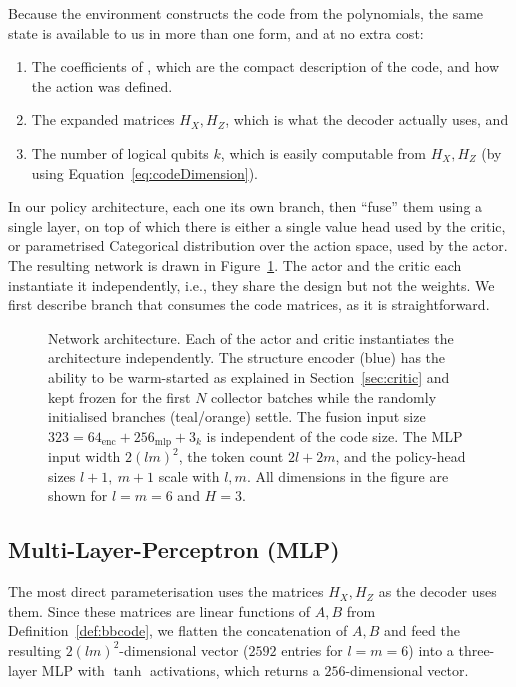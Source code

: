 \noindent Because the environment constructs the code from the polynomials, the same state is available to us in
more than one form, and at no extra cost:
\begin{enumerate}
  \item The coefficients of \polynomials{}, which are the compact description of the code, and how the action was defined.
  \item The expanded matrices \(H_X, H_Z\), which is what the decoder actually uses, and
  \item The number of logical qubits \(k\), which is easily computable from \(H_X,H_Z\) (by using Equation~\ref{eq:codeDimension}).
\end{enumerate}
In our policy architecture, each one its own branch, then ``fuse'' them using a single layer, 
on top of which there is either a single value head used by the critic, or parametrised Categorical distribution over the action space, used by the actor.
The resulting network is drawn in Figure~\ref{fig:hybrid}. 
The actor and the critic each instantiate it independently, i.e., they share the design but not the weights.
We first describe branch that consumes the code matrices, as it is straightforward.
\begin{figure}
  \centering
  \resizebox{\textwidth}{!}{}
  \caption{Network architecture. Each of the actor and critic instantiates
  the architecture independently. The structure encoder
  (blue) has the ability to be warm-started as explained in Section~\ref{sec:critic} and kept frozen for the
  first \(N\) collector batches while the randomly initialised branches
  (teal/orange) settle. 
  The fusion input size \(323 = 64_{\mathrm{enc}} + 256_{\mathrm{mlp}} + 3_{k}\) is
independent of the code size. The MLP input width \(2(lm)^2\), the token count
\(2l+2m\), and the policy-head sizes \(l{+}1,\ m{+}1\) scale with \(l,m\). All
dimensions in the figure are shown for \(l=m=6\) and \(H=3\).}
  \label{fig:hybrid}
\end{figure}

\subsection{Multi-Layer-Perceptron (MLP)\label{sec:mlpBranch}}
The most direct parameterisation uses the matrices \(H_X,H_Z\) as the decoder uses them. 
Since these matrices are linear functions of \(A,B\) from Definition~\ref{def:bbcode}, we flatten the
concatenation of \(A,B\) and feed the resulting \(2{(lm)}^{2}\)-dimensional vector (\(2592\) entries for \(l=m=6\)) 
into a three-layer MLP with \(\tanh\) activations, which returns a \(256\)-dimensional vector.

